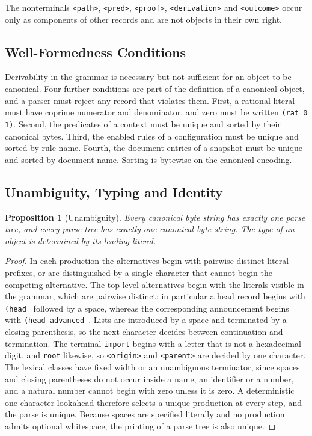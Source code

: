 \documentclass[11pt,a4paper]{article}
\theoremstyle{plain}
\newtheorem{proposition}[theorem]{Proposition}
\theoremstyle{definition}
\theoremstyle{remark}
\theoremstyle{definition}
\newcommand{\code}[1]{\texttt{#1}}
\begin{document}
The nonterminals \code{<path>}, \code{<pred>}, \code{<proof>}, \code{<derivation>} and \code{<outcome>} occur only as components of other records and are not objects in their own right.

\subsection{Well-Formedness Conditions}

Derivability in the grammar is necessary but not sufficient for an object to be canonical. Four further conditions are part of the definition of a canonical object, and a parser must reject any record that violates them. First, a rational literal must have coprime numerator and denominator, and zero must be written \code{(rat 0 1)}. Second, the predicates of a context must be unique and sorted by their canonical bytes. Third, the enabled rules of a configuration must be unique and sorted by rule name. Fourth, the document entries of a snapshot must be unique and sorted by document name. Sorting is bytewise on the canonical encoding.

\subsection{Unambiguity, Typing and Identity}

\begin{proposition}[Unambiguity]
\label{prop:unambiguous}
Every canonical byte string has exactly one parse tree, and every parse tree has exactly one canonical byte string. The type of an object is determined by its leading literal.
\end{proposition}

\begin{proof}
In each production the alternatives begin with pairwise distinct literal prefixes, or are distinguished by a single character that cannot begin the competing alternative. The top-level alternatives begin with the literals visible in the grammar, which are pairwise distinct; in particular a head record begins with \code{(head } followed by a space, whereas the corresponding announcement begins with \code{(head-advanced }. Lists are introduced by a space and terminated by a closing parenthesis, so the next character decides between continuation and termination. The terminal \code{import} begins with a letter that is not a hexadecimal digit, and \code{root} likewise, so \code{<origin>} and \code{<parent>} are decided by one character. The lexical classes have fixed width or an unambiguous terminator, since spaces and closing parentheses do not occur inside a name, an identifier or a number, and a natural number cannot begin with zero unless it is zero. A deterministic one-character lookahead therefore selects a unique production at every step, and the parse is unique. Because spaces are specified literally and no production admits optional whitespace, the printing of a parse tree is also unique.
\end{proof}
\end{document}
